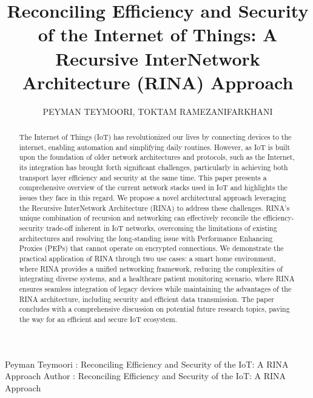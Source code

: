 \documentclass{ieeeaccess}
\begin{document}

\title{Reconciling Efficiency and Security of the Internet of Things: A Recursive InterNetwork Architecture (RINA) Approach}
\author{\uppercase{Peyman Teymoori},
\uppercase{Toktam Ramezanifarkhani}}

\address[1]{School of Business, University of South-Eastern Norway (e-mail: peyman.teymoori@usn.no)}
\address[2]{School of Economics, Innovation and Technology, Kristiania University College, Norway (e-mail: toktam.ramezanifarkhani@kristiania.no)}
\address[3]{Department of Informatics, University of Oslo, Norway (e-mail: \{peymant | toktamr\}@ifi.uio.no)}

\markboth
{Peyman Teymoori \headeretal: Reconciling Efficiency and Security of the IoT: A RINA Approach}
{Author \headeretal: Reconciling Efficiency and Security of the IoT: A RINA Approach}



\begin{abstract}
The Internet of Things (IoT) has revolutionized our lives by connecting devices to the internet, enabling automation and simplifying daily routines. However, as IoT is built upon the foundation of older network architectures and protocols, such as the Internet, its integration has brought forth significant challenges, particularly in achieving both transport layer efficiency and security at the same time. This paper presents a comprehensive overview of the current network stacks used in IoT and highlights the issues they face in this regard. We propose a novel architectural approach leveraging the Recursive InterNetwork Architecture (RINA) to address these challenges. RINA's unique combination of recursion and networking can effectively reconcile the efficiency-security trade-off inherent in IoT networks, overcoming the limitations of existing architectures and resolving the long-standing issue with Performance Enhancing Proxies (PEPs) that cannot operate on encrypted connections. We demonstrate the practical application of RINA through two use cases: a smart home environment, where RINA provides a unified networking framework, reducing the complexities of integrating diverse systems, and a healthcare patient monitoring scenario, where RINA ensures seamless integration of legacy devices while maintaining the advantages of the RINA architecture, including security and efficient data transmission. The paper concludes with a comprehensive discussion on potential future research topics, paving the way for an efficient and secure IoT ecosystem.

\end{abstract}
\end{document}
